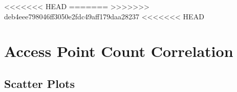 <<<<<<< HEAD
=======
>>>>>>> deb4eee798046ff3050e2fdc49aff179daa28237
<<<<<<< HEAD
\chapter{Access Point Count Correlation}
\label{ch:appendix-sensor-readings}

\section{Scatter Plots} %
\label{sec:scatter-plots}
